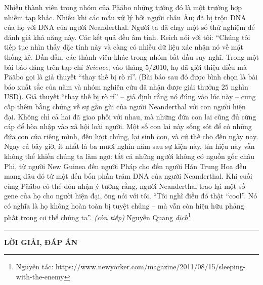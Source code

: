 \begin{multicols}{2}
	\vskip 0.1cm
	Nhiều thành viên trong nhóm của Pääbo những tưởng đó là một trường hợp nhiễm tạp khác. Nhiều khi các mẫu xử lý bởi người châu Âu; đã bị trộn DNA của họ với DNA của người Neanderthal. Người ta đã chạy một số thử nghiệm để đánh giá khả năng này. Các kết quả đều âm tính. Reich nói với tôi: “Chúng tôi tiếp tục nhìn thấy đặc tính này và càng có nhiều dữ liệu xác nhận nó về mặt thống kê. Dần dần, các thành viên khác trong nhóm bắt đầu suy nghĩ. Trong một bài báo đăng trên tạp chí \textit{Science}, vào tháng $5/2010$, họ đã giới thiệu điều mà Pääbo gọi là giả thuyết “thay thế bị rò rỉ”. (Bài báo sau đó được bình chọn là bài báo xuất sắc của năm và nhóm nghiên cứu đã nhận được giải thưởng $25$ nghìn USD).
	\vskip 0.1cm
	Giả thuyết “thay thế bị rò rỉ” -- giả định rằng nó đúng vào lúc này -- cung cấp thêm bằng chứng về sự gần gũi của người Neanderthal với con người hiện đại. Không chỉ cả hai đã giao phối với nhau, mà những đứa con lai cũng đủ cứng cáp để hòa nhập vào xã hội loài người. Một số con lai này sống sót để có những đứa con của riêng mình, đến lượt chúng, lại sinh con, và cứ thế cho đến ngày nay. Ngay cả bây giờ, ít nhất là ba mươi nghìn năm sau sự kiện này, tín hiệu này vẫn không thể khiến chúng ta làm ngơ: tất cả những người không có nguồn gốc châu Phi, từ người New Guinea đến người Pháp cho đến người Hán Trung Hoa đều mang đâu đó từ một đến bốn phần trăm DNA của người Neanderthal.
	\vskip 0.1cm
	Khi cuối cùng Pääbo có thể đón nhận ý tưởng rằng, người Neanderthal trao lại một số gene của họ cho người hiện đại, ông nói với tôi, “Tôi nghĩ điều đó thật “cool”. Nó có nghĩa là họ không hoàn toàn bị tuyệt chủng -- mà vẫn còn hiện hữu phảng phất trong cơ thể chúng ta”. 
	\vskip 0.1cm
	\hfill\textit{(còn tiếp)}
	\vskip 0.1cm
	\hfill Nguyễn Quang \textit{dịch}\footnote[2]{\color{timhieukhoahoc} Nguyên tác: https://www.newyorker.com/magazine/2011/08/15/sleeping-with-the-enemy}
\end{multicols}
\vspace*{-10pt}
{\color{timhieukhoahoc}\rule{1\linewidth}{0.1pt}}
\vskip 0.2cm
{\centerline{\LARGE\textbf{\color{timhieukhoahoc}LỜI GIẢI, ĐÁP ÁN}}}
